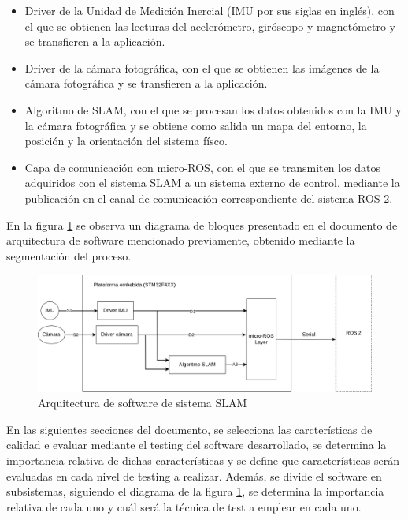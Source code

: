 \documentclass[
11pt, %
codirector, %
]{simple_charter}
\begin{document}
\begin{itemize}
	\item Driver de la Unidad de Medición Inercial (IMU por sus siglas en  inglés), con el que se
	obtienen las lecturas del acelerómetro, giróscopo y magnetómetro y se transfieren a la aplicación.
	\item Driver de la cámara fotográfica, con el que se obtienen las imágenes de la cámara
	fotográfica y se transfieren a la aplicación.
	\item Algoritmo de SLAM, con el que se procesan los datos obtenidos con la IMU y la
	cámara fotográfica y se obtiene como salida un mapa del entorno, la posición y la orientación del
	sistema físco.
	\item Capa de comunicación con micro-ROS, con el que se transmiten los datos adquiridos con el
	sistema SLAM a un sistema externo de control, mediante la publicación en el canal de comunicación
	correspondiente del sistema ROS 2.
\end{itemize}

En la figura \ref{fig:software-arch} se observa un diagrama de bloques presentado en el documento de
arquitectura de software mencionado previamente, obtenido mediante la segmentación del proceso.

\begin{figure}[ht]
	\centering
	\includegraphics[width=\textwidth]{imgs/polyphemus_pipeline.png}
	\caption{Arquitectura de software de sistema SLAM}
	\label{fig:software-arch}
\end{figure}

En las siguientes secciones del documento, se selecciona las carcterísticas de calidad e evaluar
mediante  el testing del software desarrollado, se determina la importancia relativa de dichas
características y se define que características serán evaluadas en cada nivel de testing a realizar.
Además, se  divide el software en subsistemas, siguiendo el diagrama de la figura
\ref{fig:software-arch}, se determina la importancia relativa de cada uno y cuál será la técnica de
test a emplear en cada uno.
\end{document}
